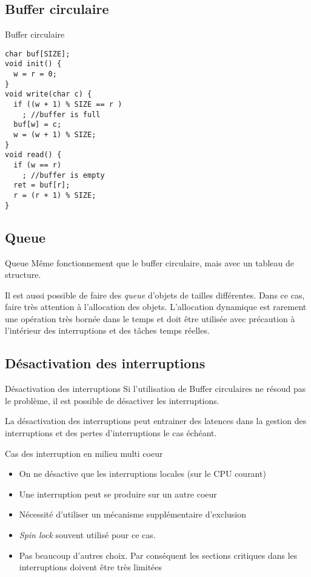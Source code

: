\subsection{Buffer circulaire}

\begin{frame}[fragile]{Buffer circulaire}
  \begin{lstlisting}
char buf[SIZE];
void init() {
  w = r = 0;
}
void write(char c) {
  if ((w + 1) % SIZE == r )
    ; //buffer is full
  buf[w] = c;
  w = (w + 1) % SIZE;
}
void read() {
  if (w == r)
    ; //buffer is empty
  ret = buf[r];
  r = (r + 1) % SIZE;
}
  \end{lstlisting}
\end{frame}

\subsection{Queue}

\begin{frame}{Queue}
  Même fonctionnement  que le buffer circulaire, mais  avec un tableau
  de structure.

  Il est aussi possible de  faire des \emph{queue} d'objets de tailles
  différentes.  Dans  ce cas, faire très attention  à l'allocation des
  objets.   L'allocation  dynamique est  rarement  une opération  très
  bornée  dans  le temps  et  doit  être  utilisée avec  précaution  à
  l'intérieur des interruptions et des tâches temps réelles.
\end{frame}

\subsection{Désactivation des interruptions}

\begin{frame}{Désactivation des interruptions}
  Si l'utilisation de Buffer circulaires ne résoud pas le problème, il
  est possible de désactiver les interruptions.

  La désactivation des interruptions peut entrainer des latences dans la
  gestion  des  interruptions  et  des  pertes  d'interruptions  le  cas
  échéant.
\end{frame}

\begin{frame}{Cas des interruption en milieu multi coeur}
  \begin{itemize}
  \item  On ne  désactive que  les interruptions  locales (sur  le CPU
    courant)
  \item Une interruption peut se produire sur un autre coeur
  \item Nécessité d'utiliser un mécanisme supplémentaire d'exclusion
  \item \emph{Spin lock} souvent utilisé pour ce cas.
  \item  Pas beaucoup  d'autres  choix.  Par  conséquent les  sections
    critiques dans les interruptions doivent être très limitées
  \end{itemize}
\end{frame}

